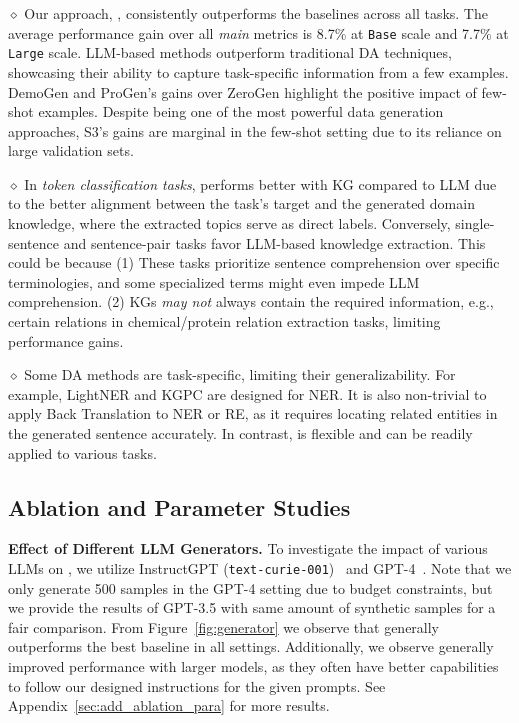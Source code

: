 \noindent $\diamond$ Our approach, {\ours}, consistently outperforms the baselines across all tasks. The average performance gain over all \textit{main} metrics is 8.7\% at \texttt{Base} scale and 7.7\% at \texttt{Large} scale. 
LLM-based methods outperform traditional DA techniques, showcasing their ability to capture task-specific information from a few examples. 
DemoGen and ProGen's gains over ZeroGen highlight the positive impact of few-shot examples.
Despite being one of the most powerful data generation approaches, S3's gains are marginal in the few-shot setting due to its reliance on large validation sets.

\noindent $\diamond$ In \textit{token classification tasks}, {\ours} performs better with KG compared to LLM due to the better alignment between the task's target and the generated domain knowledge, where the extracted topics serve as direct labels. 
Conversely, single-sentence and sentence-pair tasks favor LLM-based knowledge extraction. 
This could be because (1) These tasks prioritize sentence comprehension over specific terminologies, and some specialized terms might even impede LLM comprehension. (2) KGs \emph{may not} always contain the required information, e.g., certain relations in chemical/protein relation extraction tasks, limiting performance gains.

\noindent $\diamond$ Some DA methods are task-specific, limiting their generalizability. For example, LightNER and KGPC are designed for NER. It is also non-trivial to apply Back Translation to NER or RE, as it requires locating related entities in the generated sentence accurately.
In contrast, {\ours} is flexible and can be readily applied to various tasks.

\subsection{Ablation and Parameter Studies}
\label{sec:ablation}
\noindent \textbf{Effect of Different LLM Generators.}
To investigate the impact of various LLMs on {\ours},  
we utilize InstructGPT (\texttt{text-curie-001})~\citep{ouyang2022training} and GPT-4~\citep{gpt4}. Note that we only generate 500 samples in the GPT-4 setting due to budget constraints, but we provide the results of GPT-3.5 with same amount of synthetic samples for a fair comparison. 
From Figure~\ref{fig:generator} we observe that {\ours} generally outperforms the best baseline in all settings.
Additionally, we observe generally improved performance with larger models, as they often have better capabilities to follow our designed instructions for the given prompts. See Appendix~\ref{sec:add_ablation_para} for more results.

